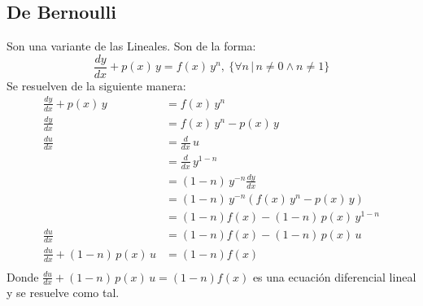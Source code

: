\documentclass[letterpaper, 12pt]{article}
\begin{document}
\begin{justify}
        \subsection*{De Bernoulli}
        \justify
        Son una variante de las Lineales. Son de la forma:
        {\large\[\frac{dy}{dx}+p(x)\, y=f(x)\, y^n,\: \{\forall n\,|\, n\neq 0 \land n\neq 1\}\]}
        Se resuelven de la siguiente manera:
        {\large \begin{equation*}
            \begin{aligned}
                \frac{dy}{dx}+p(x)\, y&=f(x)\, y^n\\[5pt]
                \frac{dy}{dx}&=f(x)\, y^n-p(x)\, y\\[5pt]
                \frac{du}{dx}&=\frac{d}{dx}\, u\\[5pt]
                &=\frac{d}{dx}\, y^{1-n}\\[5pt]
                &=(1-n)\, y^{-n}\frac{dy}{dx}\\[5pt]
                &=(1-n)\, y^{-n}\left(f(x)\, y^n-p(x)\, y\right)\\[5pt]
                &=(1-n)f(x)-(1-n)\, p(x)\, y^{1-n}\\[5pt]
                \frac{du}{dx}&=(1-n)f(x)-(1-n)\, p(x)\, u\\[5pt]
                \frac{du}{dx}+(1-n)\, p(x)\, u&=(1-n)f(x)\\[5pt]
            \end{aligned}
        \end{equation*}}
        \justify
        Donde \(\frac{du}{dx}+(1-n)\, p(x)\, u=(1-n)f(x)\) es una ecuación diferencial lineal y se resuelve como tal.
    \end{justify}
\end{document}
